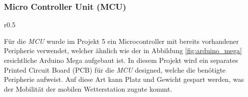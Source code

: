 \subsubsection{Micro Controller Unit (MCU)}
\begin{wrapfigure}{r}{0.5\textwidth}
  \vspace{-10pt}
  \begin{center}
  \end{center}
  \vspace{-10pt}
  \caption{Arduino Mega \cite{Elektronik}}
  \vspace{-10pt}
  \label{fig:arduino_mega}
\end{wrapfigure}
Für die \textit{MCU} wurde im Projekt 5 ein Microcontroller mit bereits vorhandener Peripherie verwendet, welcher ähnlich wie der in Abbildung \ref{fig:arduino_mega} ersichtliche Arduino Mega aufgebaut ist. In diesem Projekt wird ein separates Printed Circuit Board (PCB) für die \textit{MCU} designed, welche die benötigte Peripherie aufweist. Auf diese Art kann Platz und Gewicht gespart werden, was der Mobilität der mobilen Wetterstation zugute kommt.\\